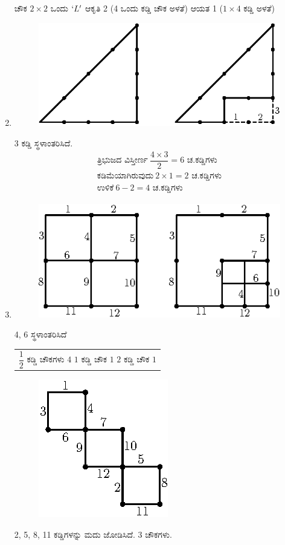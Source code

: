 \begin{enumerate}
ಚೌಕ $2\times 2$ ಒಂದು $`L'$ ಆಕೃತಿ 2 (4 ಒಂದು ಕಡ್ಡಿ ಚೌಕ ಅಳತೆ) ಆಯತ 1 ($1\times 4$ ಕಡ್ಡಿ ಅಳತೆ)

\item 
\begin{figure}[H]
\centering
\includegraphics{images/chap10/ans10.eps}
\end{figure}

3 ಕಡ್ಡಿ ಸ್ಥಳಾಂತರಿಸಿದೆ. 
\begin{gather*}
\text{ತ್ರಿಭುಜದ ವಿಸ್ತೀರ್ಣ}~ \dfrac{4\times 3}{2} = 6 \text{ ಚ.ಕಡ್ಡಿಗಳು}\\
\text{ಕಡಿಮೆಯಾಗಿರುವುದು}~ 2\times 1 = 2 \text{ ಚ.ಕಡ್ಡಿಗಳು}\\
\text{ಉಳಿಕೆ}~ 6 - 2 = 4 \text{ ಚ.ಕಡ್ಡಿಗಳು}
\end{gather*}

\item 
\begin{figure}[H]
\centering
\includegraphics{images/chap10/ans11a.eps}
\end{figure}
4, 6 ಸ್ಥಳಾಂತರಿಸಿದೆ
\begin{tabular}{l}
$\dfrac{1}{2}$ ಕಡ್ಡಿ ಚೌಕಗಳು $4$
$1$ ಕಡ್ಡಿ ಚೌಕ  $1$
$2$ ಕಡ್ಡಿ ಚೌಕ  $1$
\end{tabular}

\begin{figure}[H]
\centering
\includegraphics{images/chap10/ans11b.eps}
\end{figure}
2, 5, 8, 11 ಕಡ್ಡಿಗಳನ್ನು ಮದು ಜೋಡಿಸಿದೆ. 3 ಚೌಕಗಳು. 


\end{enumerate}
